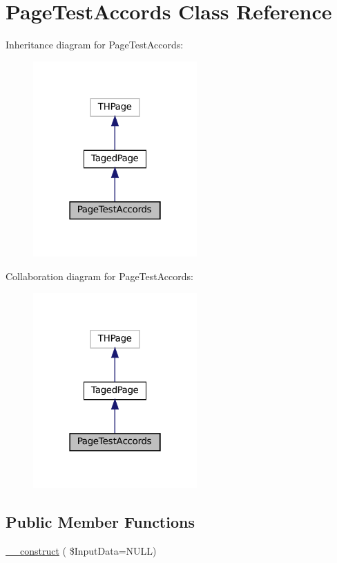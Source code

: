 \hypertarget{class_page_test_accords}{}\section{Page\+Test\+Accords Class Reference}
\label{class_page_test_accords}


Inheritance diagram for Page\+Test\+Accords\+:\nopagebreak
\begin{figure}[H]
\begin{center}
\leavevmode
\includegraphics[width=178pt]{class_page_test_accords__inherit__graph}
\end{center}
\end{figure}


Collaboration diagram for Page\+Test\+Accords\+:\nopagebreak
\begin{figure}[H]
\begin{center}
\leavevmode
\includegraphics[width=178pt]{class_page_test_accords__coll__graph}
\end{center}
\end{figure}
\subsection*{Public Member Functions}
\begin{DoxyCompactItemize}
\item 
\hyperlink{class_page_test_accords_ad6555048fa59957079e5b3df9a6628e9}{\+\_\+\+\_\+construct} ( \$Input\+Data=N\+U\+LL)
\end{DoxyCompactItemize}
